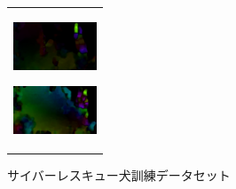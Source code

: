 \begin{figure}[htbp]
\begin{tabular}{l}
\begin{minipage}{0.165\hsize}
\begin{center}
          \includegraphics[clip, width=2.5cm]{./Figures/optic_walk4.eps}
          \hspace{0.1cm} { }
        \end{center}
      \end{minipage}
      \begin{minipage}{0.165\hsize}
        \begin{center}
          \includegraphics[clip, width=2.5cm]{./Figures/optic_walk5.eps}
          \hspace{2.2cm} { }
        \end{center}
      \end{minipage}
\\ %

    \end{tabular}
    \caption{サイバーレスキュー犬訓練データセット}
    \label{cyberdataset_img}
\end{figure}



